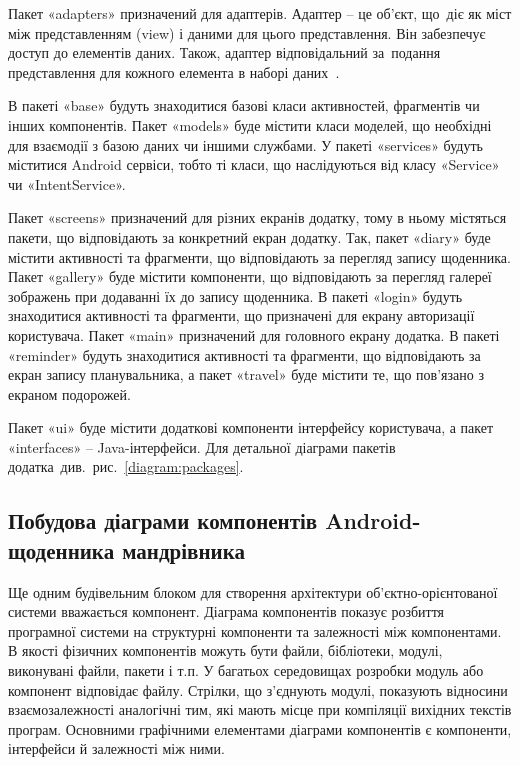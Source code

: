 \documentclass[../main.tex]{subfiles}
\begin{document}

Пакет «adapters» призначений для адаптерів. Адаптер -- це об'єкт, що~діє як міст між представленням (view) і даними для цього представлення. Він забезпечує доступ до елементів даних. Також, адаптер відповідальний за~подання представлення для кожного елемента в наборі даних~\cite{adapter}. 

В пакеті «base» будуть знаходитися базові класи активностей, фрагментів чи інших компонентів.
Пакет «models» буде містити класи моделей, що необхідні для взаємодії з базою даних чи іншими службами. У пакеті «services» будуть міститися Android сервіси, тобто ті класи, що наслідуються від класу «Service» чи «IntentService».

Пакет «screens» призначений для різних екранів додатку, тому в ньому містяться пакети, що відповідають за конкретний екран додатку. Так, пакет «diary» буде містити активності та фрагменти, що відповідають за перегляд запису щоденника. Пакет «gallery» буде містити компоненти, що відповідають за перегляд галереї зображень при додаванні їх до запису щоденника. В пакеті «login» будуть знаходитися активності та фрагменти, що призначені для екрану авторизації користувача. Пакет «main» призначений для головного екрану додатка. В пакеті «reminder» будуть знаходитися активності та фрагменти, що відповідають за екран запису планувальника, а пакет «travel» буде містити те, що пов'язано з екраном подорожей.

Пакет «ui» буде містити додаткові компоненти інтерфейсу користувача, а пакет «interfaces» -- Java-інтерфейси. Для детальної діаграми пакетів додатка~див.~рис.~\ref{diagram:packages}.


\subsection{Побудова діаграми компонентів Android-щоденника мандрівника}
Ще одним будівельним блоком для створення архітектури \mbox{об'єктно-орієнтованої} системи вважається компонент. Діаграма компонентів показує розбиття програмної системи на структурні компоненти та залежності між компонентами. В якості фізичних компонентів можуть бути файли, бібліотеки, модулі, виконувані файли, пакети і т.п. У багатьох середовищах розробки модуль або компонент відповідає файлу. Стрілки, що з'єднують модулі, показують відносини взаємозалежності аналогічні тим, які мають місце при компіляції вихідних текстів програм. Основними графічними елементами діаграми компонентів є компоненти, інтерфейси й залежності між ними. 
\end{document}
